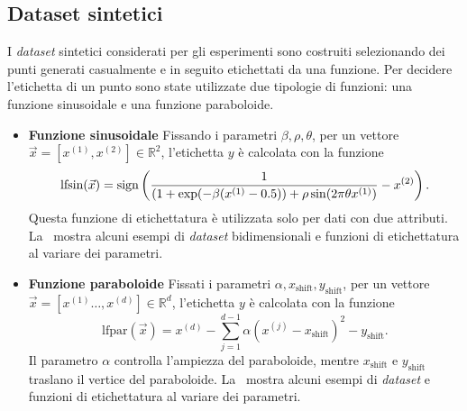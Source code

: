 \subsection{Dataset sintetici}
I \emph{dataset} sintetici considerati per gli esperimenti sono costruiti selezionando dei punti generati casualmente e in seguito etichettati da una funzione.
Per decidere l'etichetta di un punto sono state utilizzate due tipologie di funzioni: una funzione sinusoidale e una funzione paraboloide.
\begin{itemize}
    \item \textbf{Funzione sinusoidale} Fissando i parametri $\beta,\rho,\theta$, per un vettore $\Vec{x}=[x^{(1)},x^{(2)}] \in \mathbb{R}^2$, l'etichetta $y$ è calcolata con la funzione
    \begin{equation}\label{eq:sinusoid_dataset_lf}
    \textrm{lfsin}(\Vec{x}) = \mathrm{sign}\left(\frac{1}{(1 + \exp(-\beta(x^{(1)} - 0.5)) + \rho \sin(2\pi\theta x^{(1)})} - x^{(2)}\right).
    \end{equation}
    Questa funzione di etichettatura è utilizzata solo per dati con due attributi. La~ mostra alcuni esempi di \emph{dataset} bidimensionali e funzioni di etichettatura al variare dei parametri.

    \item \textbf{Funzione paraboloide} Fissati i parametri $\alpha, x_\text{shift}, y_\text{shift}$, per un vettore $\Vec{x}=[x^{(1)}\dots, x^{(d)}] \in \mathbb{R}^d$, l'etichetta $y$ è calcolata con la funzione
    \begin{equation}\label{eq:pacman_dataset_lf}
    \textrm{lfpar}(\Vec{x})= x^{(d)} - \sum_{j=1}^{d-1}\alpha(x^{(j)} - x_\text{shift})^2 - y_\text{shift}.
    \end{equation}
    Il parametro $\alpha$ controlla l'ampiezza del paraboloide, mentre $x_\text{shift}$ e $y_\text{shift}$ traslano il vertice del paraboloide.
    La~ mostra alcuni esempi di \emph{dataset} e funzioni di etichettatura al variare dei parametri.
\end{itemize}
